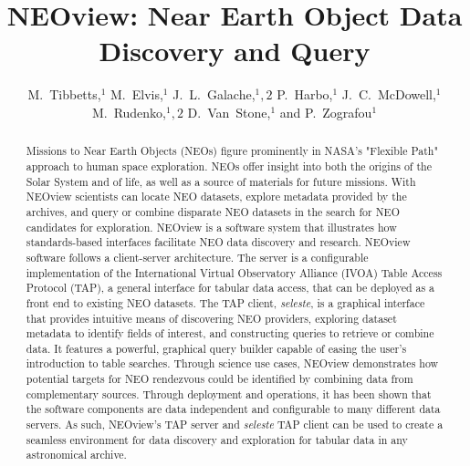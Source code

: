 
\resetcounters


\title{NEOview: Near Earth Object Data Discovery and Query}
\author{M.~Tibbetts,$^1$ M.~Elvis,$^1$ J.~L.~Galache,$^1,2$ P.~Harbo,$^1$ J.~C.~McDowell,$^1$ M.~Rudenko,$^1,2$ D.~Van~Stone,$^1$ and P.~Zografou$^1$
}


\begin{abstract}
Missions to Near Earth Objects (NEOs) figure prominently in NASA's "Flexible Path" approach to human space exploration. NEOs offer insight into both the origins of the Solar System and of life, as well as a source of materials for future missions. With NEOview scientists can locate NEO datasets, explore metadata provided by the archives, and query or combine disparate NEO datasets in the search for NEO candidates for exploration.  NEOview is a software system that illustrates how standards-based interfaces facilitate NEO data discovery and research.  NEOview software follows a client-server architecture. The server is a configurable implementation of the International Virtual Observatory Alliance (IVOA) Table Access Protocol (TAP), a general interface for tabular data access, that can be deployed as a front end to existing NEO datasets. The TAP client, \textit{seleste}, is a graphical interface that provides intuitive means of discovering NEO providers, exploring dataset metadata to identify fields of interest, and constructing queries to retrieve or combine data. It features a powerful, graphical query builder capable of easing the user's introduction to table searches.  Through science use cases, NEOview demonstrates how potential targets for NEO rendezvous could be identified by combining data from complementary sources. Through deployment and operations, it has been shown that the software components are data independent and configurable to many different data servers. As such, NEOview's TAP server and \textit{seleste} TAP client can be used to create a seamless environment for data discovery and exploration for tabular data in any astronomical archive.
\end{abstract}

